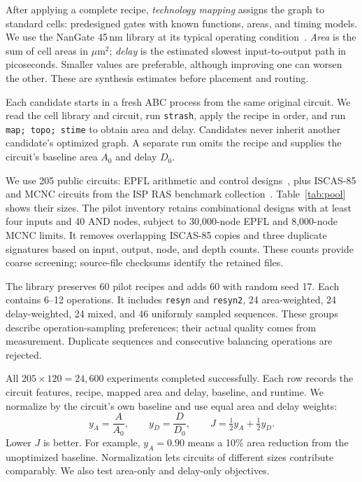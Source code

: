 \documentclass[11pt,a4paper]{article}
\makeatletter
\newcommand{\op}[1]{\texttt{#1}}
\renewcommand\subsection{\@startsection{subsection}{2}{\z@}{1em}{.3em}{\normalfont\normalsize\bfseries}}
\makeatother
\begin{document}
After applying a complete recipe, \emph{technology mapping} assigns the graph to standard cells: predesigned gates with known functions, areas, and timing models. We use the NanGate 45\,nm library at its typical operating condition~\cite{nangate}. \emph{Area} is the sum of cell areas in $\mu\mathrm{m}^2$; \emph{delay} is the estimated slowest input-to-output path in picoseconds. Smaller values are preferable, although improving one can worsen the other. These are synthesis estimates before placement and routing.

Each candidate starts in a fresh ABC process from the same original circuit. We read the cell library and circuit, run \op{strash}, apply the recipe in order, and run \op{map; topo; stime} to obtain area and delay. Candidates never inherit another candidate's optimized graph. A separate run omits the recipe and supplies the circuit's baseline area $A_0$ and delay $D_0$.

\subsection{Dataset and objective}

We use 205 public circuits: EPFL arithmetic and control designs~\cite{epfl}, plus ISCAS-85 and MCNC circuits from the ISP RAS benchmark collection~\cite{hdl}. Table~\ref{tab:pool} shows their sizes. The pilot inventory retains combinational designs with at least four inputs and 40 AND nodes, subject to 30,000-node EPFL and 8,000-node MCNC limits. It removes overlapping ISCAS-85 copies and three duplicate signatures based on input, output, node, and depth counts. These counts provide coarse screening; source-file checksums identify the retained files.

\begin{table}[htbp]
\centering\small

\caption{Circuit inventory. Size and depth describe the original AIG.}
\label{tab:pool}
\end{table}

The library preserves 60 pilot recipes and adds 60 with random seed 17. Each contains 6--12 operations. It includes \op{resyn} and \op{resyn2}, 24 area-weighted, 24 delay-weighted, 24 mixed, and 46 uniformly sampled sequences. These groups describe operation-sampling preferences; their actual quality comes from measurement. Duplicate sequences and consecutive balancing operations are rejected.

All $205\times120=24,600$ experiments completed successfully. Each row records the circuit features, recipe, mapped area and delay, baseline, and runtime. We normalize by the circuit's own baseline and use equal area and delay weights:
\begin{equation}
y_A=\frac{A}{A_0},\qquad y_D=\frac{D}{D_0},\qquad
J=\tfrac12 y_A+\tfrac12 y_D.
\label{eq:objective}
\end{equation}
Lower $J$ is better. For example, $y_A=0.90$ means a 10\% area reduction from the unoptimized baseline. Normalization lets circuits of different sizes contribute comparably. We also test area-only and delay-only objectives.
\end{document}
